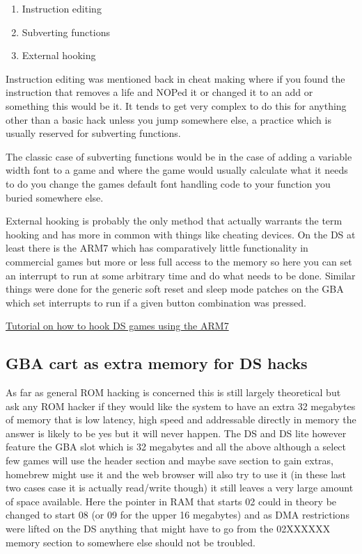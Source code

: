 \documentclass[
]{book}
\providecommand{\tightlist}{%
  \setlength{\itemsep}{0pt}\setlength{\parskip}{0pt}}
\begin{document}
\begin{enumerate}
\def\labelenumi{\arabic{enumi}.}
\tightlist
\item
  Instruction editing
\item
  Subverting functions
\item
  External hooking
\end{enumerate}

Instruction editing was mentioned back in cheat making where if you found the instruction that removes a life and NOPed it or changed it to an add or something this would be it. It tends to get very complex to do this for anything other than a basic hack unless you jump somewhere else, a practice which is usually reserved for subverting functions.

The classic case of subverting functions would be in the case of adding a variable width font to a game and where the game would usually calculate what it needs to do you change the games default font handling code to your function you buried somewhere else.

External hooking is probably the only method that actually warrants the term hooking and has more in common with things like cheating devices. On the DS at least there is the ARM7 which has comparatively little functionality in commercial games but more or less full access to the memory so here you can set an interrupt to run at some arbitrary time and do what needs to be done. Similar things were done for the generic soft reset and sleep mode patches on the GBA which set interrupts to run if a given button combination was pressed.

\href{https://web.archive.org/web/20110810025458/http://crackerscrap.com/docs/dshooking.html}{Tutorial on how to hook DS games using the ARM7}

\hypertarget{gba-cart-as-extra-memory-for-ds-hacks}{%
\subsection{GBA cart as extra memory for DS hacks}\label{gba-cart-as-extra-memory-for-ds-hacks}}

As far as general ROM hacking is concerned this is still largely theoretical but ask any ROM hacker if they would like the system to have an extra 32 megabytes of memory that is low latency, high speed and addressable directly in memory the answer is likely to be yes but it will never happen. The DS and DS lite however feature the GBA slot which is 32 megabytes and all the above although a select few games will use the header section and maybe save section to gain extras, homebrew might use it and the web browser will also try to use it (in these last two cases case it is actually read/write though) it still leaves a very large amount of space available. Here the pointer in RAM that starts 02 could in theory be changed to start 08 (or 09 for the upper 16 megabytes) and as DMA restrictions were lifted on the DS anything that might have to go from the 02XXXXXX memory section to somewhere else should not be troubled.
\end{document}
